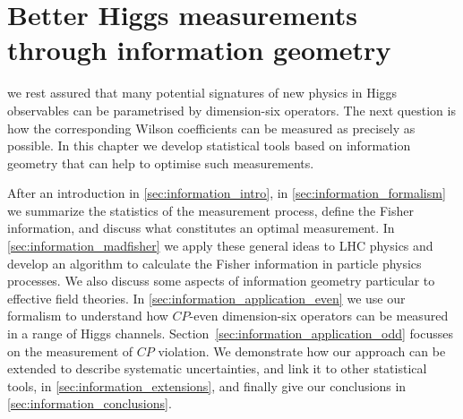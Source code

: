  




\chapter{Better Higgs measurements through information geometry}
\label{chapter:information}

 we rest assured
that many potential signatures of new physics in Higgs observables can
be parametrised by dimension-six operators. The next question is how
the corresponding Wilson coefficients can be measured as precisely as
possible. In this chapter we develop statistical tools based on
information geometry that can help to optimise such measurements.

After an introduction in \autoref{sec:information_intro}, in
\autoref{sec:information_formalism} we summarize the statistics of the
measurement process, define the Fisher information, and discuss what
constitutes an optimal measurement. In
\autoref{sec:information_madfisher} we apply these general ideas to
LHC physics and develop an algorithm to calculate the Fisher
information in particle physics processes. We also discuss some
aspects of information geometry particular to effective field
theories. In \autoref{sec:information_application_even} we use our
formalism to understand how $CP$-even dimension-six operators can be
measured in a range of Higgs channels.
Section~\autoref{sec:information_application_odd} focusses on the
measurement of $CP$ violation. We demonstrate how our approach can be
extended to describe systematic uncertainties, and link it to other
statistical tools, in \autoref{sec:information_extensions}, and
finally give our conclusions in \autoref{sec:information_conclusions}.

